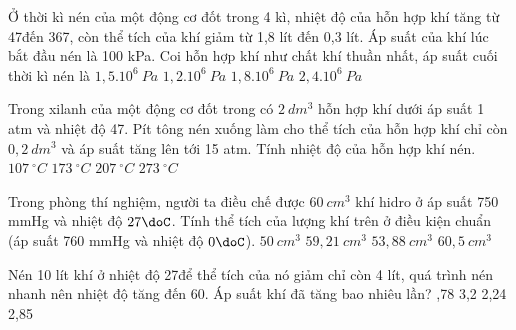 \begin{ex} %
	Ở thời kì nén của một động cơ đốt trong 4 kì, nhiệt độ của hỗn hợp khí tăng từ 47\doC đến 367\doC, còn thể tích của khí giảm từ 1,8 lít đến 0,3 lít. Áp suất của khí lúc bắt đầu nén là 100 kPa. Coi hỗn hợp khí như chất khí thuần nhất, áp suất cuối thời kì nén là
	\choice
	{$1,5.10^6\ Pa$}
	{\True $1,2.10^6\ Pa$}
	{$1,8.10^6\ Pa$}
	{$2,4.10^6\ Pa$}
\end{ex}
\begin{ex} %
	Trong xilanh của một động cơ đốt trong có $2\ dm^3$ hỗn hợp khí dưới áp suất 1 atm và nhiệt độ 47\doC. Pít tông nén xuống làm cho thể tích của hỗn hợp khí chỉ còn $0,2\ dm^3$ và áp suất tăng lên tới 15 atm. Tính nhiệt độ của hỗn hợp khí nén.
	\choice
	{$107\ ^{\circ}C$}
	{$173\ ^{\circ}C$}
	{\True $207\ ^{\circ}C$}
	{$273\ ^{\circ}C$}
\end{ex}
\begin{ex} %
	Trong phòng thí nghiệm, người ta điều chế được $60\ cm^3$ khí hidro ở áp suất 750 mmHg và nhiệt độ $27\doC$. Tính thể tích của lượng khí trên ở điều kiện chuẩn (áp suất 760 mmHg và nhiệt độ $0\doC$).
	\choice
	{$50\ cm^3$}
	{$59,21\ cm^3$}
	{\True $53,88\ cm^3$}
	{$60,5\ cm^3$}
\end{ex}
\begin{ex} %
	Nén 10 lít khí ở nhiệt độ 27\doC để thể tích của nó giảm chỉ còn 4 lít, quá trình nén nhanh nên nhiệt độ tăng đến 60\doC. Áp suất khí đã tăng bao nhiêu lần?
	\choice
	{,78}
	{3,2}
	{2,24}
	{2,85}
\end{ex}

